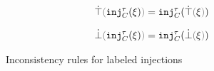 
\begin{figure}[ht]

  \begin{align*}
    \ctruify{\cinj{C}{\tau}{\xi}} & = \cinj{C}{\tau}{\ctruify{\xi}}
  \end{align*}


  \begin{align*}
    \cfalsify{\cinj{C}{\tau}{\xi}} & = \cinj{C}{\tau}{\cfalsify{\xi}}
  \end{align*}

  \judgbox{\cincon{\Xi}}{}

  \begin{mathpar}

  \end{mathpar}

  \caption{Inconsistency rules for labeled injections}
  \label{fig:labeled-sums-decidability}
\end{figure}
